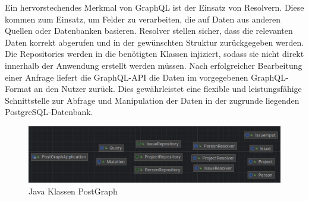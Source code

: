 \noindent
Ein hervorstechendes Merkmal von GraphQL ist der Einsatz von Resolvern. Diese kommen zum Einsatz, um Felder zu verarbeiten, die auf Daten aus anderen Quellen oder Datenbanken basieren. Resolver stellen sicher, dass die relevanten Daten korrekt abgerufen und in der gewünschten Struktur zurückgegeben werden.
\noindent
Die Repositories werden in die benötigten Klassen injiziert, sodass sie nicht direkt innerhalb der Anwendung erstellt werden müssen.
\noindent
Nach erfolgreicher Bearbeitung einer Anfrage liefert die GraphQL-API die Daten im vorgegebenen GraphQL-Format an den Nutzer zurück. Dies gewährleistet eine flexible und leistungsfähige Schnittstelle zur Abfrage und Manipulation der Daten in der zugrunde liegenden PostgreSQL-Datenbank.
\begin{figure}[H]
	\centering
	\includegraphics[scale=0.5]{Illustrations/postgraph.png}
	\caption{Java Klassen PostGraph}
\end{figure}

